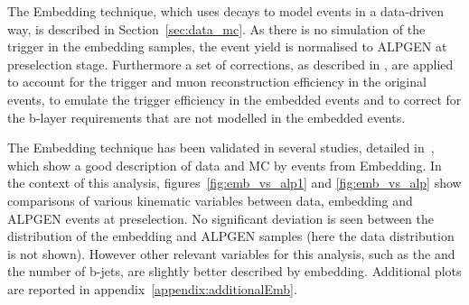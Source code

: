 

The Embedding technique, which uses \Zmumu decays to 
model \Ztautau events in a data-driven way, is described in Section~\ref{sec:data_mc}. 
As there is no simulation of the trigger in the embedding samples, the event yield
is normalised to ALPGEN \Ztautau at preselection stage. Furthermore a set of corrections, as described in \cite{SMnew}, are
applied to account for the trigger and muon reconstruction efficiency in the original \Zmumu events, to emulate the trigger efficiency in the embedded \Ztautau events and to correct for the b-layer requirements that are not modelled in the embedded events.

The Embedding technique has been validated in several studies, detailed in~\cite{Embedding, SMnew}, which show a good description of 
data and \Ztautau MC by \Ztautau events from Embedding. In the context of this analysis, figures~\ref{fig:emb_vs_alp1} and \ref{fig:emb_vs_alp} show comparisons of various kinematic variables between
data, embedding and ALPGEN \Ztautau events at preselection. No significant deviation is seen between the \mmc distribution of the embedding and ALPGEN samples (here the data \mmc distribution is not shown). However other relevant variables for this analysis, such as the \MET and the number of b-jets, are slightly better described by embedding. Additional plots are reported in appendix~\ref{appendix:additionalEmb}.

